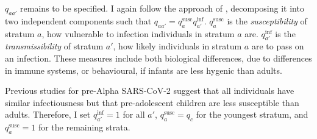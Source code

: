 \documentclass[thesis.tex]{subfiles}
\begin{document}

$q_{aa'}$ remains to be specified.
I again follow the approach of \textcite{birrellRealtime}, decomposing it into two independent components such that $q_{aa'} = q^\text{susc}_{a} q^\text{inf}_{a'}$.
$q^\text{susc}_a$ is the \emph{susceptibility} of stratum $a$, \ie how vulnerable to infection individuals in stratum $a$ are.
$q^\text{inf}_{a'}$ is the \emph{transmissibility} of stratum $a'$, \ie how likely individuals in stratum $a$ are to pass on an infection.
These measures include both biological differences, \eg due to differences in immune systems, or behavioural, \eg if infants are less hygenic than adults.


Previous studies for pre-Alpha SARS-CoV-2 suggest that all individuals have similar infectiousness but that pre-adolescent children are less susceptible than adults.
Therefore, I set $q^\text{inf}_{a'} = 1$ for all $a'$, $q^\text{susc}_{a} = q_c$ for the youngest stratum, and $q^\text{susc}_{a} = 1$ for the remaining strata.
\end{document}
